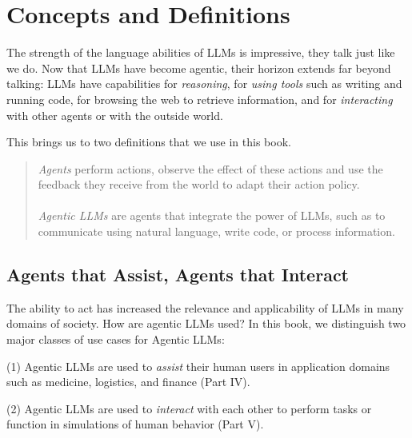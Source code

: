 \section{Concepts and Definitions}
The strength of the language abilities of LLMs is impressive,  %
they talk just like we do. Now that LLMs have become agentic, their horizon extends far beyond talking: LLMs  have capabilities for {\em reasoning}, for {\em using tools} such as writing and running code, for browsing the web to retrieve information, and for {\em interacting} with other agents or with the outside world.

This brings us to two definitions that we use in this book. 
\begin{quotation} 
\noindent
{\em Agents} perform actions,  observe the effect of these actions and  use the feedback they receive from the world to adapt their action policy.\\
\\
{\em Agentic LLMs} are agents that integrate the power of LLMs, such as to communicate using natural language,  write code, or process information.
\end{quotation}

\subsection{Agents that Assist, Agents that Interact}
The ability to act has increased the relevance and applicability of LLMs in many domains of society.
How are agentic LLMs used? In this book, we distinguish two major classes of use cases for Agentic LLMs: 

(1) Agentic LLMs are used to {\em assist} their human users in application domains such as medicine, logistics, and finance (Part IV).  

(2) Agentic LLMs are used to {\em interact} with each other to perform tasks or function in simulations of human behavior (Part V). 

